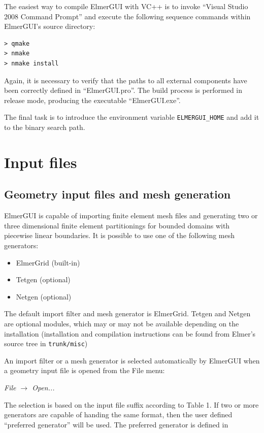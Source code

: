 \documentclass[a4paper,12pt]{article}
\newcommand{\menu}[2]{{\it \vskip2mm #1 $\rightarrow$ #2 \vskip2mm}}
\begin{document}
The easiest way to compile ElmerGUI with VC++ is to invoke ``Visual Studio 2008 Command Prompt''
and execute the following sequence commands within ElmerGUI's source directory:
\begin{verbatim}
> qmake
> nmake
> nmake install
\end{verbatim}

Again, it is necessary to verify that the paths to all external components have been correctly
defined in ``ElmerGUI.pro''. The build process is performed in release mode, producing the
executable ``ElmerGUI.exe''.

The final task is to introduce the environment variable {\tt ELMERGUI\_HOME} and add it to the
binary search path.

\section{Input files}

\subsection{Geometry input files and mesh generation}

ElmerGUI is capable of importing finite element mesh files and generating two or three
dimensional finite element partitionings for bounded domains with piecewise linear
boundaries. It is possible to use one of the following mesh generators:
\begin{itemize}
 \item ElmerGrid (built-in)
 \item Tetgen (optional)
 \item Netgen (optional)
\end{itemize}
The default import filter and mesh generator is ElmerGrid. Tetgen and Netgen are optional
modules, which may or may not be available depending on the installation (installation and
compilation instructions can be found from Elmer's source tree in {\tt trunk/misc})

An import filter or a mesh generator is selected automatically by ElmerGUI when a geometry
input file is opened from the File menu:

\menu{File}{Open...}

The selection is based on the input file suffix according to Table 1. If two or more
generators are capable of handing the same format, then the user defined ``preferred
generator'' will be used. The preferred generator is defined in
\end{document}
